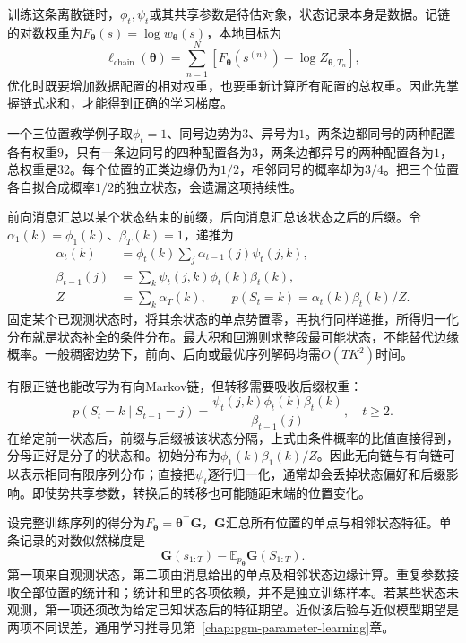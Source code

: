 训练这条离散链时，$\phi_t,\psi_t$或其共享参数是待估对象，状态记录本身是数据。记链的对数权重为$F_{\bm\theta}(s)=\log w_{\bm\theta}(s)$，本地目标为
\begin{equation}
  \ell_{\mathrm{chain}}(\bm\theta)
      =\sum_{n=1}^{N}
          [F_{\bm\theta}(s^{(n)})-\log Z_{\bm\theta,T_n}],
  \label{eq:pgm-dynamic-undirected-chain-objective}
\end{equation}
优化时既要增加数据配置的相对权重，也要重新计算所有配置的总权重。因此先掌握链式求和，才能得到正确的学习梯度。

一个三位置教学例子取$\phi_t=1$、同号边势为$3$、异号为$1$。两条边都同号的两种配置各有权重$9$，只有一条边同号的四种配置各为$3$，两条边都异号的两种配置各为$1$，总权重是$32$。每个位置的正类边缘仍为$1/2$，相邻同号的概率却为$3/4$。把三个位置各自拟合成概率$1/2$的独立状态，会遗漏这项持续性。

前向消息汇总以某个状态结束的前缀，后向消息汇总该状态之后的后缀。令$\alpha_1(k)=\phi_1(k)$、$\beta_T(k)=1$，递推为
\begin{equation}
  \begin{aligned}
    \alpha_t(k)&=\phi_t(k)\sum_j\alpha_{t-1}(j)\psi_t(j,k),\\
    \beta_{t-1}(j)&=\sum_k\psi_t(j,k)\phi_t(k)\beta_t(k),\\
    Z&=\sum_k\alpha_T(k),\qquad
    p(S_t=k)=\alpha_t(k)\beta_t(k)/Z.
  \end{aligned}
  \label{eq:pgm-dynamic-undirected-chain-messages}
\end{equation}
固定某个已观测状态时，将其余状态的单点势置零，再执行同样递推，所得归一化分布就是状态补全的条件分布。最大积和回溯则求整段最可能状态，不能替代边缘概率。一般稠密边势下，前向、后向或最优序列解码均需$O(TK^2)$时间。

有限正链也能改写为有向Markov链，但转移需要吸收后缀权重：
\begin{equation}
  p(S_t=k\mid S_{t-1}=j)
     =\frac{\psi_t(j,k)\phi_t(k)\beta_t(k)}{\beta_{t-1}(j)},
     \quad t\ge2.
  \label{eq:pgm-dynamic-undirected-chain-transition}
\end{equation}
在给定前一状态后，前缀与后缀被该状态分隔，上式由条件概率的比值直接得到，分母正好是分子的状态和。初始分布为$\phi_1(k)\beta_1(k)/Z$。因此无向链与有向链可以表示相同有限序列分布；直接把$\psi_t$逐行归一化，通常却会丢掉状态偏好和后缀影响。即使势共享参数，转换后的转移也可能随距末端的位置变化。

设完整训练序列的得分为$F_{\bm\theta}=\bm\theta^\top\bm G$，$\bm G$汇总所有位置的单点与相邻状态特征。单条记录的对数似然梯度是
\[
  \bm G(s_{1:T})-\mathbb E_{p_{\bm\theta}}\bm G(S_{1:T}).
\]
第一项来自观测状态，第二项由消息给出的单点及相邻状态边缘计算。重复参数接收全部位置的统计和；统计和里的各项依赖，并不是独立训练样本。若某些状态未观测，第一项还须改为给定已知状态后的特征期望。近似该后验与近似模型期望是两项不同误差，通用学习推导见第~\ref{chap:pgm-parameter-learning}章。

